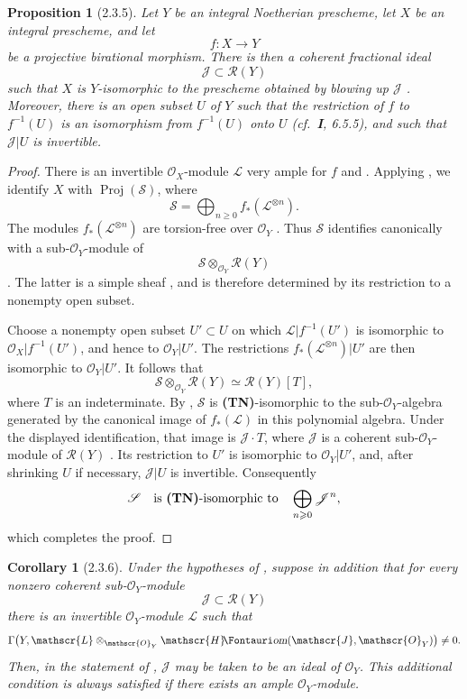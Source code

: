 \documentclass[oneside]{amsart}
\theoremstyle{ega-env-style}
\theoremstyle{ega-thm-env-style}
\newtheorem*{proposition}{Proposition}
\newtheorem*{corollary}{Corollary}
\theoremstyle{ega-defn-env-style}
\def\mathcal{\mathscr}
\def\sh{\mathcal}                   %
\def\geq{\geqslant}                 %
\def\Proj{\operatorname{Proj}}
\def\shHom{\sh{H}\textup{\kern-2.2pt{\Fontauri\slshape om}}}   %
\newcommand{\oldpage}[2][]{{\marginnote{\normalfont{\textbf{#1}~|~#2}}}\ignorespaces}
\let\EGAOriginalLabel\label
\renewcommand{\label}[1]{\phantomsection\EGAOriginalLabel{#1}}
\begin{document}
\oldpage[III]{106}
\begin{proposition}[2.3.5]
\label{III.2.3.5}
Let $Y$ be an integral Noetherian prescheme, let $X$ be an integral prescheme, and let
\[
  f:X\longrightarrow Y
\]
be a projective birational morphism.
There is then a coherent fractional ideal
\[
  \sh{J}\subset\sh{R}(Y)
\]
 such that $X$ is $Y$-isomorphic to the prescheme obtained by blowing up $\sh{J}$ .
Moreover, there is an open subset $U$ of $Y$ such that the restriction of $f$ to $f^{-1}(U)$ is an isomorphism from $f^{-1}(U)$ onto $U$ (cf.\ \textbf{I}, 6.5.5), and such that $\sh{J}|U$ is invertible.
\end{proposition}

\begin{proof}
There is an invertible $\sh{O}_X$-module $\sh{L}$ very ample for $f$  and .
Applying , we identify $X$ with $\Proj(\sh{S})$, where
\[
  \sh{S}=\bigoplus_{n\geq0}f_*(\sh{L}^{\otimes n}).
\]
The modules $f_*(\sh{L}^{\otimes n})$ are torsion-free over $\sh{O}_Y$ .
Thus $\sh{S}$ identifies canonically with a sub-$\sh{O}_Y$-module of
\[
  \sh{S}\otimes_{\sh{O}_Y}\sh{R}(Y)
\]
.
The latter is a simple sheaf , and is therefore determined by its restriction to a nonempty open subset.

Choose a nonempty open subset $U'\subset U$ on which $\sh{L}|f^{-1}(U')$ is isomorphic to $\sh{O}_X|f^{-1}(U')$, and hence to $\sh{O}_Y|U'$.
The restrictions $f_*(\sh{L}^{\otimes n})|U'$ are then isomorphic to $\sh{O}_Y|U'$.
It follows that
\[
  \sh{S}\otimes_{\sh{O}_Y}\sh{R}(Y)
  \simeq\sh{R}(Y)[T],
\]
where $T$ is an indeterminate.
By , $\sh{S}$ is \textbf{(TN)}-isomorphic to the sub-$\sh{O}_Y$-algebra generated by the canonical image of $f_*(\sh{L})$ in this polynomial algebra.
Under the displayed identification, that image is $\sh{J}\cdot T$, where $\sh{J}$ is a coherent sub-$\sh{O}_Y$-module of $\sh{R}(Y)$ .
Its restriction to $U'$ is isomorphic to $\sh{O}_Y|U'$, and, after shrinking $U$ if necessary, $\sh{J}|U$ is invertible.
Consequently
\[
  \sh{S}\quad\text{is \textbf{(TN)}-isomorphic to}\quad
  \bigoplus_{n\geq0}\sh{J}^n,
\]
which completes the proof.
\end{proof}

\begin{corollary}[2.3.6]
\label{III.2.3.6}
Under the hypotheses of , suppose in addition that for every nonzero coherent sub-$\sh{O}_Y$-module
\[
  \sh{J}\subset\sh{R}(Y)
\]
there is an invertible $\sh{O}_Y$-module $\sh{L}$ such that
\[
  \Gamma\bigl(Y,\sh{L}\otimes_{\sh{O}_Y}
  \shHom(\sh{J},\sh{O}_Y)\bigr)\neq0.
\]
Then, in the statement of , $\sh{J}$ may be taken to be an ideal of $\sh{O}_Y$.
This additional condition is always satisfied if there exists an ample $\sh{O}_Y$-module.
\end{corollary}
\end{document}
